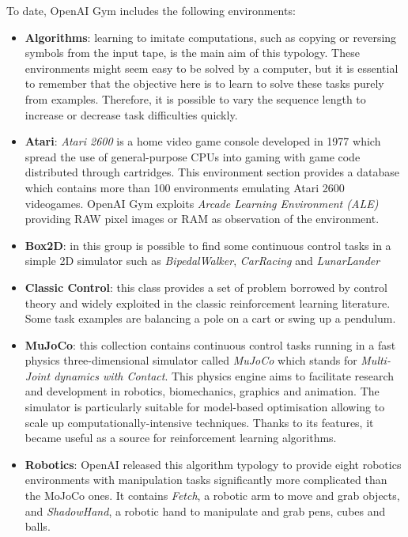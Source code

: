 To date, OpenAI Gym includes the following environments:
\begin{itemize}
	\item \textbf{Algorithms}: learning to imitate computations, such as copying or reversing symbols from the input tape, is the main aim of this typology.
These environments might seem easy to be solved by a computer, but it is essential to remember that the objective here is to learn to solve these tasks purely from examples.
Therefore, it is possible to vary the sequence length to increase or decrease task difficulties quickly.
	\item \textbf{Atari}: \textit{Atari 2600} is a home video game console developed in 1977 which spread the use of general-purpose CPUs into gaming with game code distributed through cartridges.
This environment section provides a database which contains more than 100 environments emulating Atari 2600 videogames.
OpenAI Gym exploits \textit{Arcade Learning Environment (ALE)} \cite{bellemare2013arcade} providing RAW pixel images or RAM as observation of the environment.
	\item \textbf{Box2D}: in this group is possible to find some continuous control tasks in a simple 2D simulator such as \textit{BipedalWalker}, \textit{CarRacing} and \textit{LunarLander}
	\item \textbf{Classic Control}: this class provides a set of problem borrowed by control theory and widely exploited in the classic reinforcement learning literature.
Some task examples are balancing a pole on a cart or swing up a pendulum.
	\item \textbf{MuJoCo}: this collection contains continuous control tasks running in a fast physics three-dimensional simulator called \textit{MuJoCo} which stands for \textit{Multi-Joint dynamics with Contact}.
This physics engine aims to facilitate research and development in robotics, biomechanics, graphics and animation.
The simulator is particularly suitable for model-based optimisation allowing to scale up computationally-intensive techniques.
	      Thanks to its features, it became useful as a source for reinforcement learning algorithms.
\cite{todorov2012mujoco}
	\item \textbf{Robotics}: OpenAI released this algorithm typology to provide eight robotics environments with manipulation tasks significantly more complicated than the MoJoCo ones.
It contains \textit{Fetch}, a robotic arm to move and grab objects, and \textit{ShadowHand}, a robotic hand to manipulate and grab pens, cubes and balls.
\cite{ingredientsRoboticsResearch}
\end{itemize}

